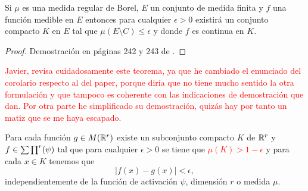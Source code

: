 \begin{teorema} \label{teo:Lusin}
    Si $\mu$ es una medida regular de Borel, $E$ un conjunto de medida finita 
    y $f$ una función medible en $E$ entonces
    para cualquier $\epsilon > 0$ existirá un conjunto compacto 
    $K$ en $E$ tal que $\mu(E \setminus C) \leq \epsilon$ y donde $f$ es continua en $K$. 
\end{teorema}
\begin{proof}
    Demostración en páginas 242 y 243 de \cite{nla.cat-vn1819421}.
\end{proof}

\textcolor{red}{Javier, revisa cuidadosamente este teorema, ya que he cambiado el enunciado del corolario respecto al del paper, porque 
diría que no tiene mucho sentido la otra formulación y 
 que tampoco es coherente con las indicaciones de demostración
 que dan.
 Por otra parte he simplificado su demostración, quizás 
 hay por tanto un matiz que se me haya escapado. 
 }
\begin{corolario}
    Para cada función $g \in M(\mathbb{R}^r)$ existe un subconjunto compacto 
    $K$ de $\mathbb{R}^r$ y $f \in \sum \prod^r (\psi)$ tal que para cualquier 
    $\epsilon > 0$ se tiene que 
    \textcolor{red}{$\mu(K) > 1- \epsilon$} y para cada $x \in K$ tenemos que 
    \begin{equation}
        |f(x) - g(x) | < \epsilon,
    \end{equation}
    independientemente de la función de activación $\psi$, dimensión $r$ o medida $\mu$. 
\end{corolario}
